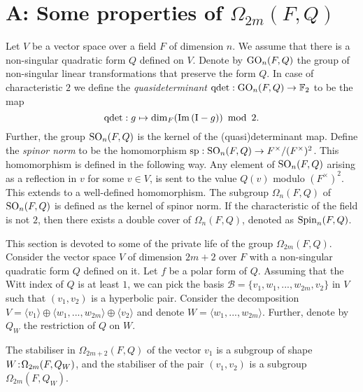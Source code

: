 
\chapter{A: Some properties of $\Omega_{2m}(F,Q)$}
\label{AppA}

Let $V$ be a vector space over a field $F$ of dimension $n$. We assume that there is a 
non-singular quadratic form $Q$ defined on $V$. Denote by $\mathrm{GO}_n(F,Q)$ the group of 
non-singular linear transformations that preserve the
form $Q$. In case of characteristic $2$ we define the \textit{quasideterminant}
$\mathrm{qdet}:\mathrm{GO}_n(F,Q) \rightarrow \mathbb{F}_2$ to be the map
\begin{equation}
    \operatorname{qdet}: g \mapsto \dim_F ( \mathrm{Im}\,(\mathord{\mathrm{I}} - g) )\ \operatorname{mod}\ 2.
\end{equation}
Further, the group $\mathrm{SO}_n(F,Q)$ is the kernel of the (quasi)determinant map. Define the 
\textit{spinor norm} to be the homomorphism $\mathrm{sp} : \mathrm{SO}_n(F,Q) \rightarrow F^{\times} / 
(F^{\times})^2$. This homomorphism is defined in the following way. Any element of 
$\mathrm{SO}_n(F,Q)$ arising as a reflection in $v$ for some $v \in V$, is sent to the value
$Q(v)$ modulo $(F^{\times})^2$. This extends to a well-defined homomorphism. The subgroup
$\Omega_n(F, Q)$ of $\mathrm{SO}_n(F,Q)$ is defined as the kernel of spinor norm. If the characteristic 
of the field is not $2$, then there exists a double cover of $\Omega_n(F,Q)$, denoted as
$\mathrm{Spin}_n(F,Q)$. 

This section is devoted to some of the private life of the group $\Omega_{2m}(F,Q)$.
Consider the vector space $V$ of dimension
$2m+2$ over $F$ with a non-singular quadratic form $Q$ defined on it. 
Let $f$ be a polar form of $Q$. 
Assuming that the Witt index of $Q$ is at least $1$, we can pick 
the basis $\mathcal{B} = \{v_1, w_1,...,w_{2m}, v_2\}$ in $V$ such that $(v_1,v_2)$ 
is a hyperbolic pair. Consider the decomposition $V = \langle v_1 \rangle \oplus
\langle w_1, ..., w_{2m} \rangle \oplus \langle v_2 \rangle$ and denote 
$W = \langle w_1, ..., w_{2m} \rangle$. Further, denote by $Q_W$ the restriction of 
$Q$ on $W$.

\begin{lemma}
    \label{lemma:1_stabiliser_omega}
	The stabiliser in $\Omega_{2m+2}(F,Q)$ of the vector $v_1$ 
	is a subgroup of shape $W\mathord{{\;\!{:}\;\!}}\Omega_{2m}(F,Q_W)$, and the stabiliser of 
	the pair $(v_1,v_2)$ is a subgroup $\Omega_{2m}(F,Q_W)$.  
\end{lemma}

